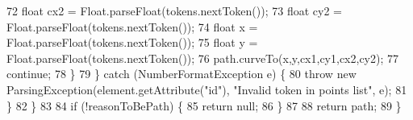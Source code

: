 \begin{DoxyCode}
72                     \textcolor{keywordtype}{float} cx2 = Float.parseFloat(tokens.nextToken());
73                     \textcolor{keywordtype}{float} cy2 = Float.parseFloat(tokens.nextToken());
74                     \textcolor{keywordtype}{float} x = Float.parseFloat(tokens.nextToken());
75                     \textcolor{keywordtype}{float} y = Float.parseFloat(tokens.nextToken());
76                     path.curveTo(x,y,cx1,cy1,cx2,cy2);
77                     \textcolor{keywordflow}{continue};
78                 \}
79             \} \textcolor{keywordflow}{catch} (NumberFormatException e) \{
80                 \textcolor{keywordflow}{throw} \textcolor{keyword}{new} ParsingException(element.getAttribute(\textcolor{stringliteral}{"id"}), \textcolor{stringliteral}{"Invalid token in points list"}, e);
81             \}
82         \}
83         
84         \textcolor{keywordflow}{if} (!reasonToBePath) \{
85             \textcolor{keywordflow}{return} null;
86         \}
87         
88         \textcolor{keywordflow}{return} path;
89     \}
\end{DoxyCode}
